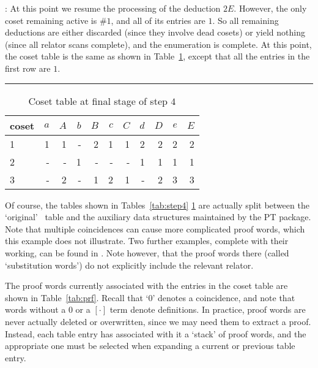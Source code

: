 :
At this point we resume the processing of the deduction $2E$.
However, the only coset remaining active is \#$1$, and all of its entries
  are $1$.
So all remaining deductions are either discarded (since they involve dead
  cosets) or yield nothing (since all relator scans complete), and the
  enumeration is complete.
At this point, the coset table is the same as shown in
  Table~\ref{tab:step4f}, except that all the entries in the first row
  are $1$.

\begin{table}
\hrule
\caption{Coset table at final stage of step $4$}
\label{tab:step4f}
\smallskip
\renewcommand{\arraystretch}{0.875}
\begin{tabular*}{\textwidth}{@{\extracolsep{\fill}}lrrrrrrrrrr} 
\hline\hline
coset & $a$ & $A$ & $b$ & $B$ & $c$ & $C$ & $d$ & $D$ & $e$ & $E$ \\ 
\hline
 1 & 1 & 1 & - & 2 & 1 & 1 & 2 & 2 & 2 & 2 \\
 2 & - & - & 1 & - & - & - & 1 & 1 & 1 & 1 \\
 3 & - & 2 & - & 1 & 2 & 1 & - & 2 & 3 & 3 \\
\hline\hline
\end{tabular*}
\end{table}

Of course, the tables shown in Tables~\ref{tab:step4} \amp
  \ref{tab:step4f} are actually split between the `original' \ace\ table
  and the auxiliary data structures maintained by the PT package.
%
Note that multiple coincidences can cause more complicated proof
  words, which this example does not illustrate.
%
Two further examples, complete with their working, can be found in 
  \cite{Lee4}.
Note however, that the proof words there (called `substitution words') do
  not explicitly include the relevant relator.

The proof words currently associated with the entries in the coset table
  are shown in Table~\ref{tab:prf}.
Recall that `$0$' denotes a coincidence, and note that words without a
  $0$ or a $[\cdot]$ term denote definitions.
In practice, proof words are never actually deleted or overwritten, since
  we may need them to extract a proof.
Instead, each table entry has associated with it a `stack' of proof words,
  and the appropriate one must be selected when expanding a current or
  previous table entry.


